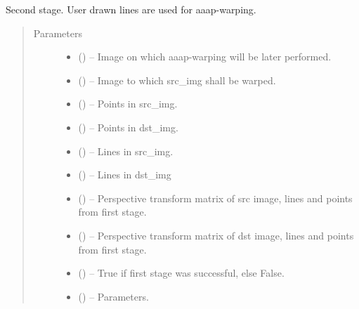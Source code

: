 \documentclass[letterpaper,10pt,english]{sphinxmanual}
\begin{document}
\begin{fulllineitems}
\label{\detokenize{aaap_re_photo:aaap_re_photo.stage_two}}
Second stage. User drawn lines are used for aaap-warping.
\begin{quote}\begin{description}
\item[{Parameters}] \leavevmode\begin{itemize}
\item {} 
 () -- Image on which aaap-warping will be later performed.

\item {} 
 () -- Image to which src\_img shall be warped.

\item {} 
 () -- Points in src\_img.

\item {} 
 () -- Points in dst\_img.

\item {} 
 () -- Lines in src\_img.

\item {} 
 () -- Lines in dst\_img

\item {} 
 () -- Perspective transform matrix of src image, lines and points
from first stage.

\item {} 
 () -- Perspective transform matrix of dst image, lines and points
from first stage.

\item {} 
 () -- True if first stage was successful, else False.

\item {} 
 () -- Parameters.

\end{itemize}

\end{description}\end{quote}

\end{fulllineitems}
\end{document}
